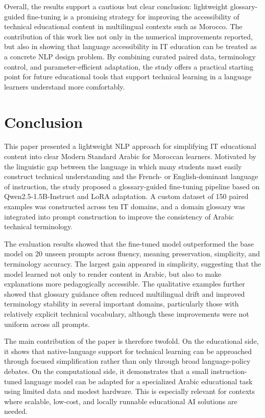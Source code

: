 \documentclass[education,article,submit,moreauthors]{Definitions/mdpi}
\begin{document}
Overall, the results support a cautious but clear conclusion: lightweight glossary-guided fine-tuning is a promising strategy for improving the accessibility of technical educational content in multilingual contexts such as Morocco. The contribution of this work lies not only in the numerical improvements reported, but also in showing that language accessibility in IT education can be treated as a concrete NLP design problem. By combining curated paired data, terminology control, and parameter-efficient adaptation, the study offers a practical starting point for future educational tools that support technical learning in a language learners understand more comfortably.

\section{Conclusion}

This paper presented a lightweight NLP approach for simplifying IT educational content into clear Modern Standard Arabic for Moroccan learners. Motivated by the linguistic gap between the language in which many students most easily construct technical understanding and the French- or English-dominant language of instruction, the study proposed a glossary-guided fine-tuning pipeline based on Qwen2.5-1.5B-Instruct and LoRA adaptation. A custom dataset of 150 paired examples was constructed across ten IT domains, and a domain glossary was integrated into prompt construction to improve the consistency of Arabic technical terminology.

The evaluation results showed that the fine-tuned model outperformed the base model on 20 unseen prompts across fluency, meaning preservation, simplicity, and terminology accuracy. The largest gain appeared in simplicity, suggesting that the model learned not only to render content in Arabic, but also to make explanations more pedagogically accessible. The qualitative examples further showed that glossary guidance often reduced multilingual drift and improved terminology stability in several important domains, particularly those with relatively explicit technical vocabulary, although these improvements were not uniform across all prompts.

The main contribution of the paper is therefore twofold. On the educational side, it shows that native-language support for technical learning can be approached through focused simplification rather than only through broad language-policy debates. On the computational side, it demonstrates that a small instruction-tuned language model can be adapted for a specialized Arabic educational task using limited data and modest hardware. This is especially relevant for contexts where scalable, low-cost, and locally runnable educational AI solutions are needed.
\end{document}
